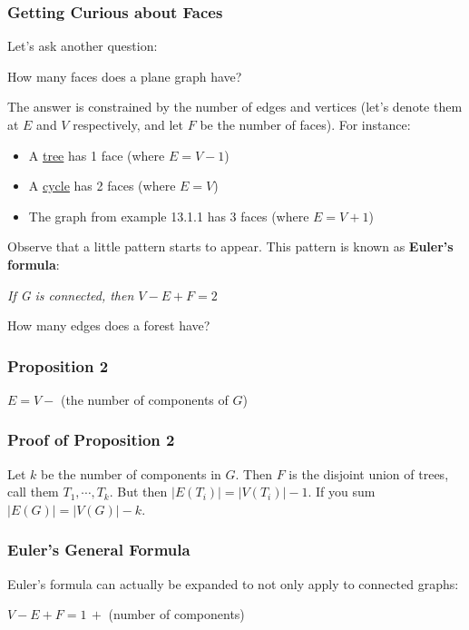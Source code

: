 \documentclass{report}
\begin{document}
\subsubsection{Getting Curious about Faces}
Let's ask another question:
\begin{center}
How many faces does a plane graph have?
\end{center}
The answer is constrained by the number of edges and vertices (let's denote them at $E$ and $V$ respectively, and let $F$ be the number of faces). For instance:
\begin{itemize}
\item A \underline{tree} has 1 face (where $E = V - 1$)
\item A \underline{cycle} has 2 faces (where $E = V$)
\item The graph from example 13.1.1 has 3 faces (where $E = V + 1$)
\end{itemize}
Observe that a little pattern starts to appear. This pattern is known as \textbf{Euler's formula}:
\begin{center}
\textit{If G is connected, then $V-E+F=2$}
\end{center}
How many edges does a forest have?
\subsubsection{Proposition 2}
\begin{center}
\textit{$E = V -$} (the number of components of $G$)
\end{center}
\subsubsection{Proof of Proposition 2}
Let $k$ be the number of components in $G$. Then $F$ is the disjoint union of trees, call them $T_1, \cdots, T_k$. But then $|E(T_i)| = |V(T_i)|-1$. If you sum $|E(G)| = |V(G)| - k$.
\subsubsection{Euler's General Formula}
Euler's formula can actually be expanded to not only apply to connected graphs:
\begin{center}
\textit{$V-E+F = 1\, +$} (number of components)
\end{center}
\end{document}
